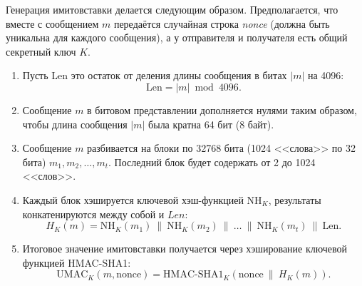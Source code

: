 Генерация имитовставки делается следующим образом. Предполагается, что вместе с сообщением $m$ передаётся случайная строка \emph{nonce} (должна быть уникальна для каждого сообщения), а у отправителя и получателя есть общий секретный ключ $K$.

\begin{enumerate}
    \item Пусть Len это остаток от деления длины сообщения в битах $|m|$ на 4096:\[
        \textrm{Len} = |m| \bmod 4096.
    \]
    \item Сообщение $m$ в битовом представлении дополняется нулями таким образом, чтобы длина сообщения $|m|$ была кратна 64 бит (8 байт).
    \item Сообщение $m$ разбивается на блоки по 32768 бита (1024 <<слова>> по 32 бита) $m_1, m_2, \dots, m_t$. Последний блок будет содержать от 2 до 1024 <<слов>>.
    \item Каждый блок хэшируется ключевой хэш-функцией $\textrm{NH}_K$, результаты конкатенируются между собой и $Len$:\[
        H_K(m) = \textrm{NH}_K (m_1) ~ \| ~ \textrm{NH}_K (m_2) ~ \| ~ \dots ~ \| ~ \textrm{NH}_K (m_t) ~ \| ~ \textrm{Len}.
    \]
    \item Итоговое значение имитовставки получается через хэширование ключевой функцией HMAC-SHA1:\[
        \textrm{UMAC}_K( m, \textrm{nonce} ) = \textrm{HMAC-SHA1}_K( \textrm{nonce} ~ \| ~ H_K(m) ).
    \]
\end{enumerate}
